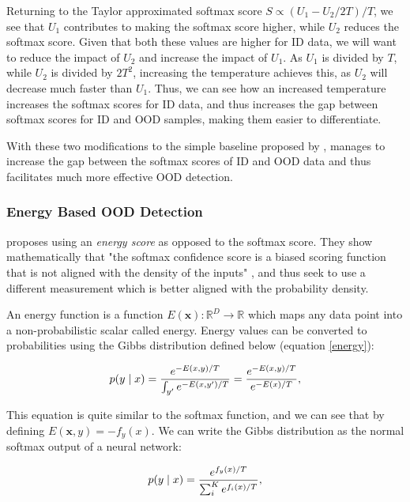 \documentclass[UKenglish]{uiomasterthesis} %
\theoremstyle{definition}
\begin{document}
Returning to the Taylor approximated softmax score ${S\propto {(U_{1}-U_{2}/2T)/T}}$, we see that $U_1$ contributes to making the softmax score higher, while $U_2$ reduces the softmax score. Given that both these values are higher for ID data, we will want to reduce the impact of $U_2$ and increase the impact of $U_1$. As $U_1$ is divided by $T$, while $U_2$ is divided by $2T^2$, increasing the temperature achieves this, as $U_2$ will decrease much faster than $U_1$. Thus, we can see how an increased temperature increases the softmax scores for ID data, and thus increases the gap between softmax scores for ID and OOD samples, making them easier to differentiate.

With these two modifications to the simple baseline proposed by \cite{oodbaseline}, \cite{odin} manages to increase the gap between the softmax scores of ID and OOD data and thus facilitates much more effective OOD detection.
\\

\subsubsection{Energy Based OOD Detection}

\cite{energy} proposes using an {\it energy score} as opposed to the softmax score. They show mathematically that "the softmax confidence score is a biased scoring function that is not aligned with the density of the inputs" \cite{energy}, and thus seek to use a different measurement which is better aligned with the probability density.

An energy function is a function $E(\bm{x}) : \mathbb{R}^D \rightarrow \mathbb{R}$ which maps any data point into a non-probabilistic scalar called energy. Energy values can be converted to probabilities using the Gibbs distribution defined below (equation \ref{energy}):

\begin{equation} \label{energy}
    p(y \mid \*x) = \frac{e^{-E(\*x,y)/T}}{\int_{y'} e^{-E(\*x, y')/T}}
    = \frac{e^{-E(\*x,y)/T}}{e^{-E(\*x)/T}},
\end{equation}

This equation is quite similar to the softmax function, and we can see that by defining $E(\bm{x}, y) = -f_y(x)$. We can write the Gibbs distribution as the normal softmax output of a neural network:

\begin{equation}\label{eq:softmax}
    p(y \mid \*x) = \frac{e^{f_y(\*x)/T}}{\sum_{i}^K e^{f_{i}(\*x)/T}},
\end{equation}
\end{document}

